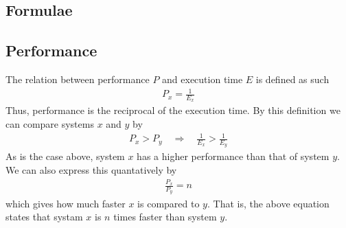 %
%

\begin{appendices}
	\section{Formulae}
	\subsection{Performance}
	\label{appendix:formulae|sub:performance}
	The relation between performance $P$ and execution time $E$ is defined as
	such
	\begin{align*}
		P_x = \frac{1}{E_x}
	\end{align*}
	Thus, performance is the reciprocal of the execution time. By this
	definition we can compare systems $x$ and $y$ by
	\begin{align*}
		P_x > P_y \quad\Rightarrow\quad \frac{1}{E_x} > \frac{1}{E_y}
	\end{align*}
	As is the case above, system $x$ has a higher performance than that of
	system $y$. We can also express this quantatively by
	\begin{align*}
		\frac{P_x}{P_y} = n
	\end{align*}
	which gives how much faster $x$ is compared to $y$. That is, the above
	equation states that systam $x$ is $n$ times faster than system $y$.
\end{appendices}

